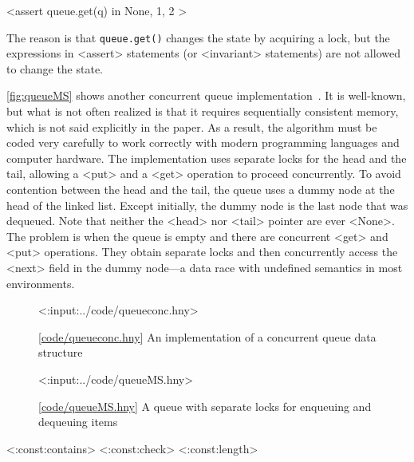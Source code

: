 \documentclass{report}
\newcommand{\harmonylink}[1]{%
[\href{https://harmony.cs.cornell.edu/#1}{\underline{#1}}]%
}
\newenvironment{code}{
\tcolorbox
}{
\endtcolorbox
}
\begin{document}
\begin{code}
<{assert queue.get(q) in { None, 1, 2 }}>
\end{code}

The reason is that \texttt{queue.get()} changes the state by
acquiring a lock, but the expressions in <{assert}>
statements (or <{invariant}> statements)
are not allowed to change the state.

\autoref{fig:queueMS} shows another
concurrent queue implementation~\cite{MS96}.
It is well-known, but what is not often realized is that
it requires sequentially consistent memory, which is not
said explicitly in the paper.
As a result, the algorithm must be coded very carefully to work
correctly with modern programming languages and
computer hardware.
The implementation uses separate
locks for the head and the tail,
allowing a <{put}> and a <{get}> operation
to proceed concurrently.  To avoid contention between the head and the tail,
the queue uses a dummy node at the head of the linked list.
Except initially, the dummy node is the last node that was dequeued.
Note that neither the <{head}> nor <{tail}> pointer are
ever <{None}>.
The problem is when the queue is empty and there are concurrent
<{get}> and <{put}> operations.
They obtain separate locks and then concurrently access the
<{next}> field in the dummy node---a data race with
undefined semantics in most environments.

\begin{figure}
\begin{code}
<{:input:../code/queueconc.hny}>
\end{code}
\caption{\harmonylink{code/queueconc.hny} An implementation of a concurrent queue data structure}
\label{fig:queueconc}
\end{figure}

\begin{figure}
\begin{code}
<{:input:../code/queueMS.hny}>
\end{code}
\caption{\harmonylink{code/queueMS.hny} A queue with separate locks for enqueuing and dequeuing items}
\label{fig:queueMS}
\end{figure}

<{:const:contains}>
<{:const:check}>
<{:const:length}>
\end{document}
